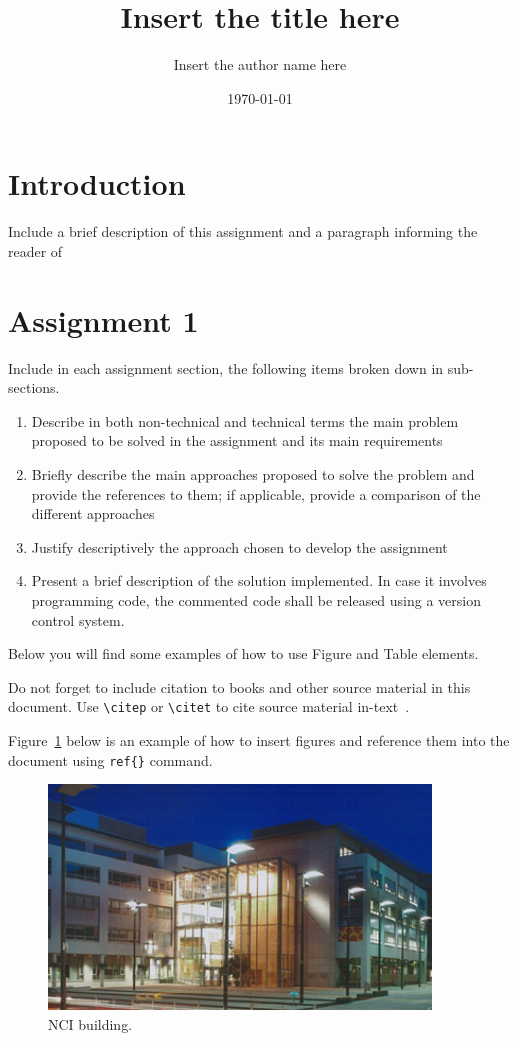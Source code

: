 \documentclass[10pt]{article}
\title{Insert the title here}
\author{Insert the author name here}
\date{\today}
\begin{document}
\maketitle
\section{Introduction}
\label{sec:intro}
Include a brief description of this assignment and a paragraph informing the reader of
\section{Assignment 1}
\label{sec:assignment1}
Include in each assignment section, the following items broken down in sub-sections.
\begin{enumerate}
  \item Describe in both non-technical and technical terms the main problem proposed to be solved in the assignment and its main requirements
  \item Briefly describe the main approaches proposed to solve the problem and provide the references to them; if applicable, provide a comparison of the different approaches
  \item Justify descriptively the approach chosen to develop the assignment
  \item Present a brief description of the solution implemented. In case it involves programming code, the commented code shall be released using a version control system.
\end{enumerate}

Below you will find some examples of how to use Figure and Table elements.

Do not forget to include citation to books and other source material in this document. Use \verb|\citep| or \verb|\citet| to cite source material in-text~\citep{author2019}.

Figure~\ref{fig:nci} below is an example of how to insert figures and reference them into the document using \verb|ref{}| command.
\begin{figure}[!th]
  \centering
  \includegraphics[width=4in]{nci-pic}
  \caption{NCI building.}
  \label{fig:nci}
\end{figure}
\end{document}

